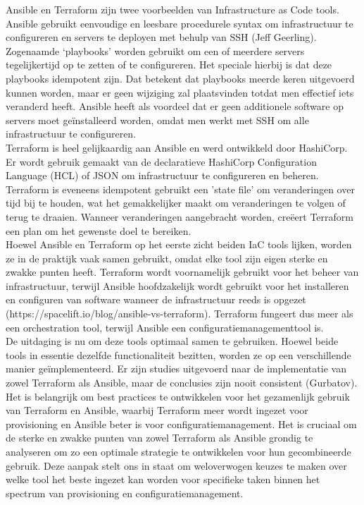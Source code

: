 Ansible en Terraform zijn twee voorbeelden van Infrastructure as Code tools. Ansible gebruikt eenvoudige en leesbare procedurele syntax om infrastructuur te configureren en servers te deployen met behulp van SSH (Jeff Geerling). Zogenaamde ‘playbooks’ worden gebruikt om een of meerdere servers tegelijkertijd op te zetten of te configureren. Het speciale hierbij is dat deze playbooks idempotent zijn. Dat betekent dat playbooks meerde keren uitgevoerd kunnen worden, maar er geen wijziging zal plaatsvinden totdat men effectief iets veranderd heeft. Ansible heeft als voordeel dat er geen additionele software op servers moet geïnstalleerd worden, omdat men werkt met SSH om alle infrastructuur te configureren. \\
Terraform is heel gelijkaardig aan Ansible en werd ontwikkeld door HashiCorp. Er wordt gebruik gemaakt van de declaratieve HashiCorp Configuration Language (HCL) of JSON om infrastructuur te configureren en beheren. Terraform is eveneens idempotent gebruikt een 'state file' om veranderingen over tijd bij te houden, wat het gemakkelijker maakt om veranderingen te volgen of terug te draaien. Wanneer veranderingen aangebracht worden, creëert Terraform een plan om het gewenste doel te bereiken. \\
Hoewel Ansible en Terraform op het eerste zicht beiden IaC tools lijken, worden ze in de praktijk vaak samen gebruikt, omdat elke tool zijn eigen sterke en zwakke punten heeft. Terraform wordt voornamelijk gebruikt voor het beheer van infrastructuur, terwijl Ansible hoofdzakelijk wordt gebruikt voor het installeren en configuren van software wanneer de infrastructuur reeds is opgezet (https://spacelift.io/blog/ansible-vs-terraform). Terraform fungeert dus meer als een orchestration tool, terwijl Ansible een configuratiemanagementtool is. \\
De uitdaging is nu om deze tools optimaal samen te gebruiken. Hoewel beide tools in essentie dezelfde functionaliteit bezitten, worden ze op een verschillende manier geïmplementeerd. Er zijn studies uitgevoerd naar de implementatie van zowel Terraform als Ansible, maar de conclusies zijn nooit consistent (Gurbatov). Het is belangrijk om best practices te ontwikkelen voor het gezamenlijk gebruik van Terraform en Ansible, waarbij Terraform meer wordt ingezet voor provisioning en Ansible beter is voor configuratiemanagement. Het is cruciaal om de sterke en zwakke punten van zowel Terraform als Ansible grondig te analyseren om zo een optimale strategie te ontwikkelen voor hun gecombineerde gebruik. Deze aanpak stelt ons in staat om weloverwogen keuzes te maken over welke tool het beste ingezet kan worden voor specifieke taken binnen het spectrum van provisioning en configuratiemanagement. \\

